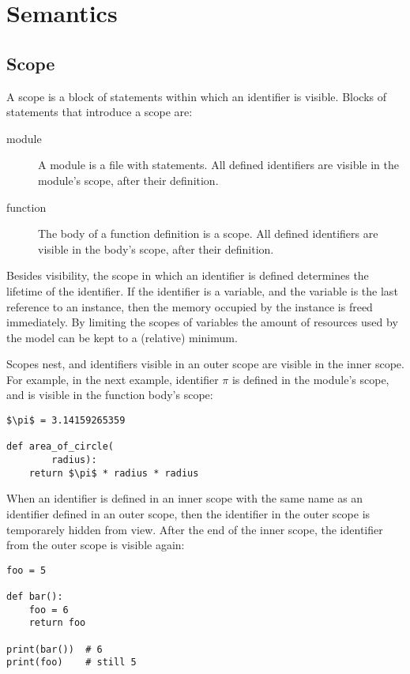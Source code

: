 \documentclass[10pt, a4paper]{article}
\begin{document}
\section{Semantics}

\subsection{Scope}
A scope is a block of statements within which an identifier is visible. Blocks of statements that introduce a scope are:

\begin{description}
    \item [module] A module is a file with statements. All defined identifiers are visible in the module's scope, after their definition.
    \item [function] The body of a function definition is a scope. All defined identifiers are visible in the body's scope, after their definition.
\end{description}

Besides visibility, the scope in which an identifier is defined determines the lifetime of the identifier. If the identifier is a variable, and the variable is the last reference to an instance, then the memory occupied by the instance is freed immediately. By limiting the scopes of variables the amount of resources used by the model can be kept to a (relative) minimum.

Scopes nest, and identifiers visible in an outer scope are visible in the inner scope. For example, in the next example, identifier $\pi$ is defined in the module's scope, and is visible in the function body's scope:

\begin{lstlisting}[mathescape]
$\pi$ = 3.14159265359

def area_of_circle(
        radius):
    return $\pi$ * radius * radius
\end{lstlisting}

When an identifier is defined in an inner scope with the same name as an identifier defined in an outer scope, then the identifier in the outer scope is temporarely hidden from view. After the end of the inner scope, the identifier from the outer scope is visible again:

\begin{lstlisting}[mathescape]
foo = 5

def bar():
    foo = 6
    return foo

print(bar())  # 6
print(foo)    # still 5
\end{lstlisting}
\end{document}
